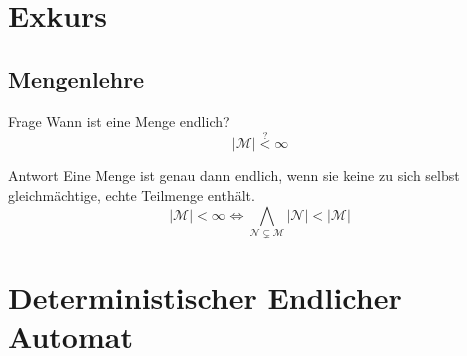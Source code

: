 \documentclass[]{beamer}
\begin{document}
\section{Exkurs}
\subsection{Mengenlehre}
\begin{frame}[<+->][squeeze]{}
  \begin{alertblock}{Frage}
    Wann ist eine Menge endlich?
    \[|\mathcal{M}| \overset{?}{<} \infty\]
  \end{alertblock}
  
  \begin{exampleblock}{Antwort}
    Eine Menge ist genau dann endlich, wenn sie keine zu sich selbst gleichm\"achtige, echte Teilmenge enth\"alt.
    \[|\mathcal{M}| < \infty \Leftrightarrow \bigwedge_{\mathcal{N} \subsetneq \mathcal{M}} |\mathcal{N}| < |\mathcal{M}|\]
  \end{exampleblock}
\end{frame}

\section{Deterministischer Endlicher Automat}
\end{document}
